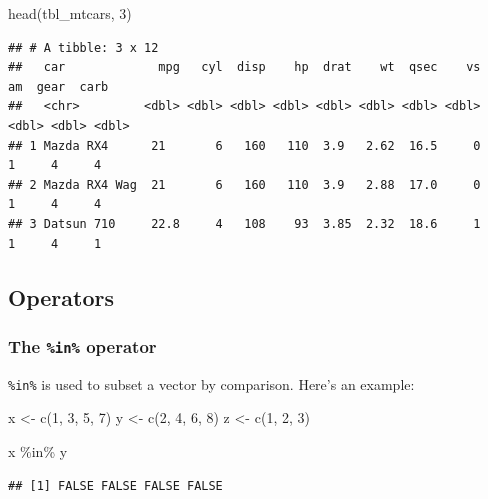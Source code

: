 \documentclass[
  12pt,
  oneside]{book}
\newenvironment{Shaded}{\begin{snugshade}}{\end{snugshade}}
\newcommand{\DecValTok}[1]{\textcolor[rgb]{0.00,0.00,0.81}{#1}}
\newcommand{\FunctionTok}[1]{\textcolor[rgb]{0.00,0.00,0.00}{#1}}
\newcommand{\NormalTok}[1]{#1}
\newcommand{\OtherTok}[1]{\textcolor[rgb]{0.56,0.35,0.01}{#1}}
\newcommand{\SpecialCharTok}[1]{\textcolor[rgb]{0.00,0.00,0.00}{#1}}
\theoremstyle{definition}
\theoremstyle{definition}
\theoremstyle{definition}
\theoremstyle{definition}
\theoremstyle{remark}
\begin{document}
\begin{Shaded}
\begin{Highlighting}[]
\FunctionTok{head}\NormalTok{(tbl\_mtcars, }\DecValTok{3}\NormalTok{)}
\end{Highlighting}
\end{Shaded}

\begin{verbatim}
## # A tibble: 3 x 12
##   car             mpg   cyl  disp    hp  drat    wt  qsec    vs    am  gear  carb
##   <chr>         <dbl> <dbl> <dbl> <dbl> <dbl> <dbl> <dbl> <dbl> <dbl> <dbl> <dbl>
## 1 Mazda RX4      21       6   160   110  3.9   2.62  16.5     0     1     4     4
## 2 Mazda RX4 Wag  21       6   160   110  3.9   2.88  17.0     0     1     4     4
## 3 Datsun 710     22.8     4   108    93  3.85  2.32  18.6     1     1     4     1
\end{verbatim}

\hypertarget{operators}{%
\subsection{Operators}\label{operators}}

\hypertarget{the-in-operator}{%
\subsubsection{\texorpdfstring{The \texttt{\%in\%} operator}{The \%in\% operator}}\label{the-in-operator}}

\texttt{\%in\%} is used to subset a vector by comparison. Here's an example:

\begin{Shaded}
\begin{Highlighting}[]
\NormalTok{x }\OtherTok{\textless{}{-}} \FunctionTok{c}\NormalTok{(}\DecValTok{1}\NormalTok{, }\DecValTok{3}\NormalTok{, }\DecValTok{5}\NormalTok{, }\DecValTok{7}\NormalTok{)}
\NormalTok{y }\OtherTok{\textless{}{-}} \FunctionTok{c}\NormalTok{(}\DecValTok{2}\NormalTok{, }\DecValTok{4}\NormalTok{, }\DecValTok{6}\NormalTok{, }\DecValTok{8}\NormalTok{)}
\NormalTok{z }\OtherTok{\textless{}{-}} \FunctionTok{c}\NormalTok{(}\DecValTok{1}\NormalTok{, }\DecValTok{2}\NormalTok{, }\DecValTok{3}\NormalTok{)}

\NormalTok{x }\SpecialCharTok{\%in\%}\NormalTok{ y  }
\end{Highlighting}
\end{Shaded}

\begin{verbatim}
## [1] FALSE FALSE FALSE FALSE
\end{verbatim}
\end{document}
